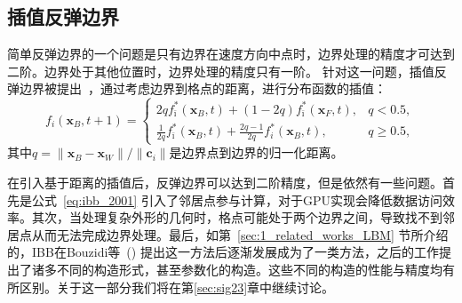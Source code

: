 \subsection{插值反弹边界}
简单反弹边界的一个问题是只有边界在速度方向中点时，边界处理的精度才可达到二阶。边界处于其他位置时，边界处理的精度只有一阶。
针对这一问题，插值反弹边界被提出~\cite{Bouzidi-2001}，通过考虑边界到格点的距离，进行分布函数的插值：
\begin{equation}\label{eq:ibb_2001}
    f_i(\mathbf{x}_B, t+1) = 
    \begin{cases}
        2 q f^{*}_{\bar{\imath}}(\mathbf{x}_B, t)+(1-2 q) f^{*}_{\bar{\imath}}(\mathbf{x}_{F}, t), & q < 0.5, \\
        \frac{1}{2 q} f^{*}_{\bar{\imath}}(\mathbf{x}_B, t)+\frac{2 q-1}{2 q} f^{*}_i(\mathbf{x}_B, t), & q \geq 0.5,
    \end{cases}
\end{equation}
其中$q=\|\mathbf{x}_B - \mathbf{x}_W\|/\|\bm{c}_i\|$是边界点到边界的归一化距离。

在引入基于距离的插值后，反弹边界可以达到二阶精度，但是依然有一些问题。首先是公式~\ref{eq:ibb_2001} 引入了邻居点参与计算，对于GPU实现会降低数据访问效率。其次，当处理复杂外形的几何时，格点可能处于两个边界之间，导致找不到邻居点从而无法完成边界处理。最后，如第~\ref{sec:1_related_works_LBM} 节所介绍的，IBB在Bouzidi等~(\citeyear{Bouzidi-2001}) 提出这一方法后逐渐发展成为了一类方法，之后的工作提出了诸多不同的构造形式，甚至参数化的构造。这些不同的构造的性能与精度均有所区别。关于这一部分我们将在第\ref{sec:sig23}章中继续讨论。